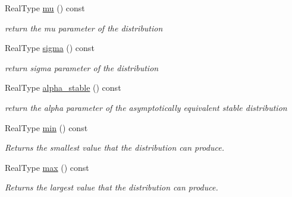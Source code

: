 \begin{DoxyCompactItemize}
\mbox{\label{structlognormal__distribution_aafbea1099645b17baf5a6789e9a17615}} 
Real\+Type \mbox{\hyperlink{structlognormal__distribution_aafbea1099645b17baf5a6789e9a17615}{mu}} () const
\begin{DoxyCompactList}\small\item\em return the mu parameter of the distribution \end{DoxyCompactList}\item 
\mbox{\label{structlognormal__distribution_a07a77c8819313d92d38a275ba1c94b55}} 
Real\+Type \mbox{\hyperlink{structlognormal__distribution_a07a77c8819313d92d38a275ba1c94b55}{sigma}} () const
\begin{DoxyCompactList}\small\item\em return sigma parameter of the distribution \end{DoxyCompactList}\item 
\mbox{\label{structlognormal__distribution_a9ca440314fb852a6dbad4ebd4ddb7573}} 
Real\+Type \mbox{\hyperlink{structlognormal__distribution_a9ca440314fb852a6dbad4ebd4ddb7573}{alpha\+\_\+stable}} () const
\begin{DoxyCompactList}\small\item\em return the alpha parameter of the asymptotically equivalent stable distribution \end{DoxyCompactList}\item 
Real\+Type \mbox{\hyperlink{structlognormal__distribution_afedf3fef881e7b36d429b50f34ef1573}{min}} () const
\begin{DoxyCompactList}\small\item\em Returns the smallest value that the distribution can produce. \end{DoxyCompactList}\item 
Real\+Type \mbox{\hyperlink{structlognormal__distribution_a2de6f05fe434834c076a67fafc311357}{max}} () const
\begin{DoxyCompactList}\small\item\em Returns the largest value that the distribution can produce. \end{DoxyCompactList}\item 
\mbox{\label{structlognormal__distribution_a59152655fdac026bc8a8eb8abadc247f}} 

\end{DoxyCompactItemize}
